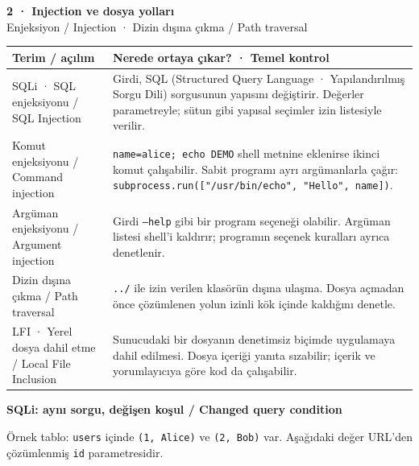 \documentclass[11pt,a4paper]{article}
\newcommand{\AltBaslik}[1]{\par\vspace{3pt}\textbf{#1}\par\nobreak}
\begin{document}
\newpage
{\Large\bfseries 2 · Injection ve dosya yolları}\\[3pt]
{\normalsize Enjeksiyon / Injection · Dizin dışına çıkma / Path traversal}\\[5pt]
\begingroup\small\begin{tabularx}{\linewidth}{@{}LY@{}}\toprule
Terim / açılım & Nerede ortaya çıkar? · Temel kontrol\\\midrule
SQLi · SQL enjeksiyonu / SQL Injection & Girdi, SQL (Structured Query Language · Yapılandırılmış Sorgu Dili) sorgusunun yapısını değiştirir. Değerler parametreyle; sütun gibi yapısal seçimler izin listesiyle verilir.\\[2pt]
Komut enjeksiyonu / Command injection & \texttt{name=alice; echo DEMO} shell metnine eklenirse ikinci komut çalışabilir. Sabit programı ayrı argümanlarla çağır: \texttt{subprocess.run(["/usr/bin/echo", "Hello", name])}.\\[2pt]
Argüman enjeksiyonu / Argument injection & Girdi \texttt{--help} gibi bir program seçeneği olabilir. Argüman listesi shell’i kaldırır; programın seçenek kuralları ayrıca denetlenir.\\[2pt]
Dizin dışına çıkma / Path traversal & \texttt{../} ile izin verilen klasörün dışına ulaşma. Dosya açmadan önce çözümlenen yolun izinli kök içinde kaldığını denetle.\\[2pt]
LFI · Yerel dosya dahil etme / Local File Inclusion & Sunucudaki bir dosyanın denetimsiz biçimde uygulamaya dahil edilmesi. Dosya içeriği yanıta sızabilir; içerik ve yorumlayıcıya göre kod da çalışabilir.\\[2pt]
\bottomrule\end{tabularx}\endgroup\par
\AltBaslik{SQLi: aynı sorgu, değişen koşul / Changed query condition}
Örnek tablo: \texttt{users} içinde \texttt{(1, Alice)} ve \texttt{(2, Bob)} var. Aşağıdaki değer URL’den çözümlenmiş \texttt{id} parametresidir.
\end{document}

